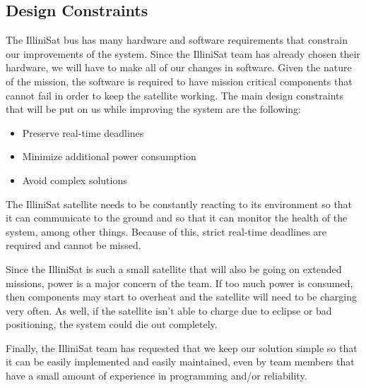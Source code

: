 \subsection{Design Constraints}
The IlliniSat bus has many hardware and software requirements that constrain our
improvements of the system. Since the IlliniSat team has already chosen their
hardware, we will have to make all of our changes in software. Given the nature
of the mission, the software is required to have mission critical components
that cannot fail in order to keep the satellite working. The main design constraints that will be put on us while improving the system are the following:
\begin{itemize}
  \item Preserve real-time deadlines
  \item Minimize additional power consumption
  \item Avoid complex solutions
\end{itemize}
The IlliniSat satellite needs to be constantly reacting to its environment so that it can communicate to the ground and so that it can monitor the health of the system, among other things. Because of this, strict real-time deadlines are required and cannot be missed. 

Since the IlliniSat is such a small satellite that will also be going on extended missions, power is a major concern of the team. If too much power is consumed, then components may start to overheat and the satellite will need to be charging very often. As well, if the satellite isn't able to charge due to eclipse or bad positioning, the system could die out completely.

Finally, the IlliniSat team has requested that we keep our solution simple so that it can be easily implemented and easily maintained, even by team members that have a small amount of experience in programming and/or reliability. 
